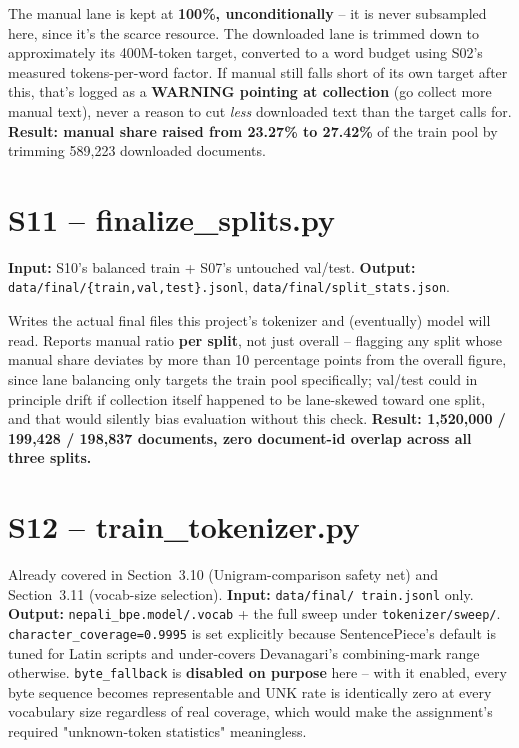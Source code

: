 \documentclass[11pt]{report}
\begin{document}
The manual lane is kept at \textbf{100\%, unconditionally} -- it is never
subsampled here, since it's the scarce resource. The downloaded lane is
trimmed down to approximately its 400M-token target, converted to a word
budget using S02's measured tokens-per-word factor. If manual still falls
short of its own target after this, that's logged as a
\textbf{WARNING pointing at collection} (go collect more manual text),
never a reason to cut \textit{less} downloaded text than the target calls
for. \textbf{Result: manual share raised from 23.27\% to 27.42\%} of the
train pool by trimming 589,223 downloaded documents.

\section{S11 -- finalize\_splits.py}

\textbf{Input:} S10's balanced train + S07's untouched val/test.
\textbf{Output:} \texttt{data/final/\{train,val,test\}.jsonl},
\texttt{data/final/split\_stats.json}.

Writes the actual final files this project's tokenizer and (eventually)
model will read. Reports manual ratio \textbf{per split}, not just
overall -- flagging any split whose manual share deviates by more than 10
percentage points from the overall figure, since lane balancing only
targets the train pool specifically; val/test could in principle drift if
collection itself happened to be lane-skewed toward one split, and that
would silently bias evaluation without this check.
\textbf{Result: 1,520,000 / 199,428 / 198,837 documents, zero document-id
overlap across all three splits.}

\section{S12 -- train\_tokenizer.py}

Already covered in Section~3.10 (Unigram-comparison safety net) and
Section~3.11 (vocab-size selection). \textbf{Input:} \texttt{data/final/
train.jsonl} only. \textbf{Output:} \texttt{nepali\_bpe.model/.vocab} +
the full sweep under \texttt{tokenizer/sweep/}.
\texttt{character\_coverage=0.9995} is set explicitly because
SentencePiece's default is tuned for Latin scripts and under-covers
Devanagari's combining-mark range otherwise. \texttt{byte\_fallback} is
\textbf{disabled on purpose} here -- with it enabled, every byte sequence
becomes representable and UNK rate is identically zero at every
vocabulary size regardless of real coverage, which would make the
assignment's required "unknown-token statistics" meaningless.
\end{document}
